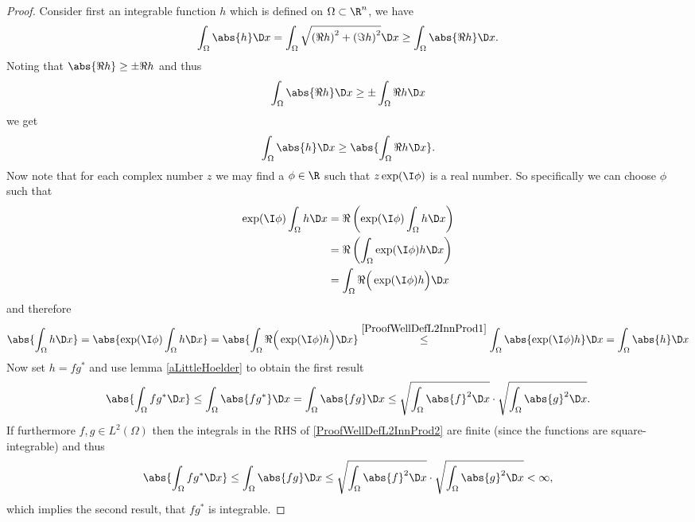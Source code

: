 \begin{proof}
	Consider first an integrable function $h$ which is defined on $\Omega \subset \R^n$, we have
	\[ \int_\Omega \abs{h} \D x = \int_\Omega \sqrt{ \left( \Re h \right)^2 + \left( \Im h \right)^2 } \D x \ge \int_\Omega \abs{ \Re h } \D x.\]
	Noting that $\abs{ \Re h } \ge \pm \Re h$ and thus 
	\[ \int_\Omega \abs{ \Re h } \D x \ge \pm \int_\Omega \Re h \D x\]
	we get
	\begin{equation}
		\int_\Omega \abs{h} \D x \ge \abs{\int_\Omega \Re h \D x}.
		\label{ProofWellDefL2InnProd1}
	\end{equation}
	Now note that for each complex number $z$ we may find a $\phi \in \R$ such that $z\exp(\I \phi)$ is a real number. 
	So specifically we can choose $\phi$ such that
	\begin{align*}
		\exp(\I \phi) \int_\Omega h \D x &= \Re \left( \exp(\I \phi) \int_\Omega h \D x \right) \\
		&=\Re \left(  \int_\Omega \exp(\I \phi) h \D x \right) \\
		&=\int_\Omega \Re \Big( \exp(\I \phi) h \Big) \D x \\
	\end{align*}
	and therefore
	\[ \abs{\int_\Omega h \D x} = \abs{\exp(\I \phi) \int_\Omega h \D x} = \abs{\int_\Omega \Re \Big( \exp(\I \phi) h \Big) \D x} \stackrel{\eqref{ProofWellDefL2InnProd1}}{\le} \int_\Omega \abs{\exp(\I \phi)  h} \D x = \int_\Omega \abs{h} \D x \]
	Now set $h = f g^\ast$ and use lemma \ref{aLittleHoelder} to obtain the first result
	\begin{equation}
		\abs{ \int_\Omega f g^\ast \D x } \le \int_\Omega \abs{f g^\ast}\D x = \int_\Omega \abs{f g}\D x \le  \sqrt{\int_\Omega \abs{f}^2 \D x} \cdot \sqrt{\int_\Omega \abs{g}^2 \D x}.
		\label{ProofWellDefL2InnProd2}
	\end{equation}
	If furthermore $f,g \in L^2(\Omega)$ then the integrals in the RHS of \eqref{ProofWellDefL2InnProd2} are finite (since the functions are square-integrable) and thus
	\[ \abs{ \int_\Omega f g^\ast \D x } \le \int_\Omega \abs{f g}\D x \le  \sqrt{\int_\Omega \abs{f}^2 \D x} \cdot \sqrt{\int_\Omega \abs{g}^2 \D x} < \infty, \]
	which implies the second result, that $f g^\ast$ is integrable.
\end{proof}

